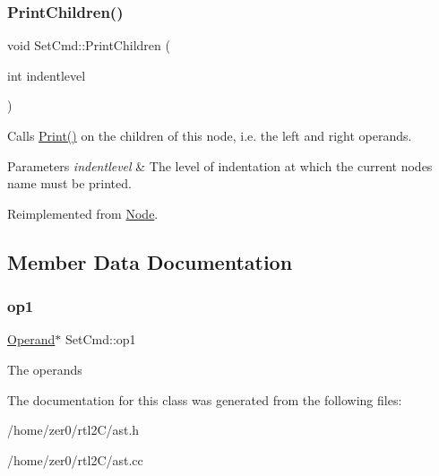 \subsubsection{\texorpdfstring{Print\+Children()}{PrintChildren()}}
{\footnotesize\ttfamily void Set\+Cmd\+::\+Print\+Children (\begin{DoxyParamCaption}\item[{int}]{indentlevel }\end{DoxyParamCaption})\hspace{0.3cm}{\ttfamily [virtual]}}

Calls \hyperlink{class_node_a9ef727fd72d1a37792b3db60a8a479dd}{Print()} on the children of this node, i.\+e. the left and right operands. 
\begin{DoxyParams}{Parameters}
{\em indentlevel} & The level of indentation at which the current node\textquotesingle{}s name must be printed. \\
\hline
\end{DoxyParams}


Reimplemented from \hyperlink{class_node_a3e67ec8d22182b721717af14fe0c3000}{Node}.



\subsection{Member Data Documentation}
\mbox{\label{class_set_cmd_a702a81ef272dd4597f628eee77b09b73}} 
\subsubsection{\texorpdfstring{op1}{op1}}
{\footnotesize\ttfamily \hyperlink{class_operand}{Operand}$\ast$ Set\+Cmd\+::op1\hspace{0.3cm}{\ttfamily [protected]}}

The operands 

The documentation for this class was generated from the following files\+:\begin{DoxyCompactItemize}
\item 
/home/zer0/rtl2\+C/ast.\+h\item 
/home/zer0/rtl2\+C/ast.\+cc\end{DoxyCompactItemize}
